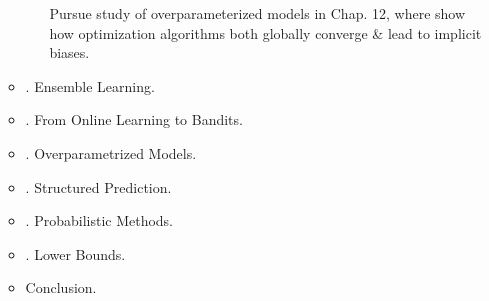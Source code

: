 \documentclass{article}
\begin{document}
\begin{enumerate}
\begin{itemize}
\begin{itemize}
			Pursue study of overparameterized models in Chap. 12, where show how optimization algorithms both globally converge \& lead to implicit biases.
		\end{itemize}
		\item {. Ensemble Learning.}
		\item {. From Online Learning to Bandits.}
		\item {. Overparametrized Models.}
		\item {. Structured Prediction.}
		\item {. Probabilistic Methods.}
		\item {. Lower Bounds.}
		\item {\sf Conclusion.}
	\end{itemize}
\end{enumerate}

\end{document}
